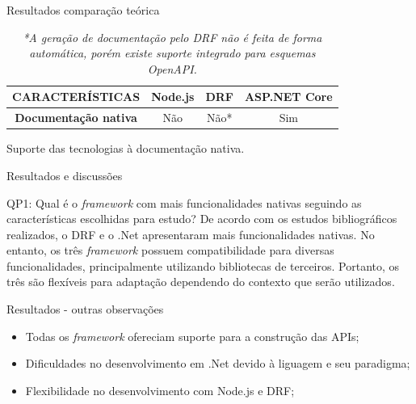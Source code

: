 \documentclass{libs/ufc_format}
\begin{document}
\begin{frame}{Resultados comparação teórica}
    \begin{table}[H]
        \centering
        \begin{tabular}{|c|c|c|c|}
        \hline
        \textbf{CARACTERÍSTICAS} & \textbf{Node.js} & \textbf{DRF} & \textbf{ASP.NET Core} \\ \hline
        \textbf{Documentação nativa}      & Não              & Não*          & Sim                   \\ \hline
        \end{tabular}
        \captionsetup{justification=centering}
        \caption{Suporte das tecnologias à documentação nativa.}
        \caption*{\textit{*A geração de documentação pelo DRF não é feita de forma automática, porém existe suporte integrado para esquemas OpenAPI.}}
        \label{tab:resultado-documentacao}
    \end{table}
\end{frame}


\begin{frame}{Resultados e discussões}
    \begin{block}{QP1: Qual é o \textit{framework} com mais funcionalidades nativas seguindo as características escolhidas para estudo?}
        De acordo com os estudos bibliográficos realizados, o DRF e o .Net apresentaram mais funcionalidades nativas. No entanto, os três \textit{framework} possuem compatibilidade para diversas funcionalidades, principalmente utilizando bibliotecas de terceiros. Portanto, os três são flexíveis para adaptação dependendo do contexto que serão utilizados.
    \end{block}
\end{frame}

\begin{frame}{Resultados - outras observações}
    \begin{itemize}
        \item Todas os \textit{framework} ofereciam suporte para a construção das APIs;
        \vspace*{0.5em}
        \item Dificuldades no desenvolvimento em .Net devido à liguagem e seu paradigma;
        \vspace*{0.5em}
        \item Flexibilidade no desenvolvimento com Node.js e DRF;
    \end{itemize}
\end{frame}
\end{document}
